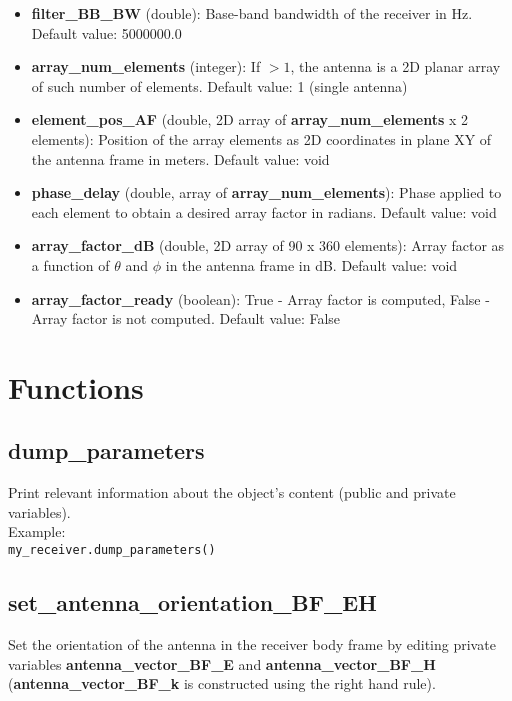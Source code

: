 \begin{itemize}
\item {\bf filter\_BB\_BW} (double):  Base-band bandwidth of the receiver in Hz. Default value: 5000000.0

\item {\bf array\_num\_elements} (integer): If $>1$, the antenna is a 2D planar array of such number of elements. Default value: 1 (single antenna)

\item {\bf element\_pos\_AF} (double, 2D array of {\bf array\_num\_elements} x 2 elements): Position of the array elements as 2D coordinates in plane XY of the antenna frame in meters. Default value: void

\item {\bf phase\_delay} (double, array of {\bf array\_num\_elements}): Phase applied to each element to obtain a desired array factor in radians. Default value: void

\item {\bf array\_factor\_dB} (double, 2D array of 90 x 360 elements): Array factor as a function of $\theta$ and $\phi$ in the antenna frame in dB. Default value: void

\item {\bf array\_factor\_ready} (boolean): True - Array factor is computed, False - Array factor is not computed. Default value: False
\end{itemize}

\section{Functions}

\subsection{dump\_parameters}

Print relevant information about the object's content (public and private variables).\\

Example:\\

\texttt{my\_receiver.dump\_parameters()}\\


\subsection{set\_antenna\_orientation\_BF\_EH}

Set the orientation of the antenna in the receiver body frame by editing private variables {\bf antenna\_vector\_BF\_E} and {\bf antenna\_vector\_BF\_H} ({\bf antenna\_vector\_BF\_k} is constructed using the right hand rule).\\

